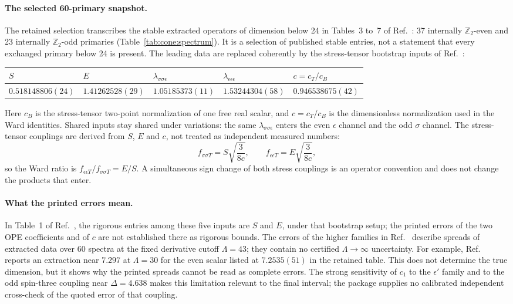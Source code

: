 \documentclass[11pt,a4paper]{article}
\numberwithin{equation}{section}
\begin{document}
\paragraph{The selected 60-primary snapshot.} The retained selection transcribes the stable extracted operators of
dimension below 24 in Tables~3 to~7 of Ref.~\cite{Simmons-Duffin:2016wlq}: 37 internally $\mathbb Z_2$-even and 23
internally $\mathbb Z_2$-odd primaries (Table~\ref{tab:cone:spectrum}). It is a selection of published stable entries,
not a statement that every exchanged primary below 24 is present. The leading data are replaced coherently by the
stress-tensor bootstrap inputs of Ref.~\cite{Chang:2024whx}:
\begin{center}\small
\begin{tabular}{@{}lllll@{}}
\toprule
$S$ & $E$ & $\lambda_{\sigma\sigma\epsilon}$ & $\lambda_{\epsilon\epsilon\epsilon}$ & $c=c_T/c_B$\\
\midrule
$0.518148806(24)$ & $1.41262528(29)$ & $1.05185373(11)$ & $1.53244304(58)$ & $0.946538675(42)$\\
\bottomrule
\end{tabular}
\end{center}
Here $c_B$ is the stress-tensor two-point normalization of one free real scalar, and $c=c_T/c_B$ is the dimensionless
normalization used in the Ward identities. Shared inputs stay shared under variations: the same
$\lambda_{\sigma\sigma\epsilon}$ enters the even $\epsilon$ channel and the odd $\sigma$ channel. The stress-tensor
couplings are derived from $S$, $E$ and $c$, not treated as independent measured numbers:
\begin{equation}
 f_{\sigma\sigma T}=S\sqrt{\frac{3}{8c}},\qquad f_{\epsilon\epsilon T}=E\sqrt{\frac{3}{8c}},
 \label{eq:cone:ward}
\end{equation}
so the Ward ratio is $f_{\epsilon\epsilon T}/f_{\sigma\sigma T}=E/S$. A simultaneous sign change of both stress
couplings is an operator convention and does not change the products that enter.

\paragraph{What the printed errors mean.} In Table~1 of Ref.~\cite{Chang:2024whx}, the rigorous entries among these
five inputs are $S$ and $E$, under that bootstrap setup; the printed errors of the two OPE coefficients and of $c$ are
not established there as rigorous bounds. The errors of the higher families in Ref.~\cite{Simmons-Duffin:2016wlq}
describe spreads of extracted data over 60 spectra at the fixed derivative cutoff $\Lambda=43$; they contain no
certified $\Lambda\to\infty$ uncertainty. For example, Ref.~\cite{Henriksson:2022} reports an extraction near $7.297$
at $\Lambda=30$ for the even scalar listed at $7.2535(51)$ in the retained table. This does not determine the true
dimension, but it shows why the printed spreads cannot be read as complete errors. The strong sensitivity of $c_1$ to
the $\epsilon'$ family and to the odd spin-three coupling near $\Delta=4.638$ makes this limitation relevant to the
final interval; the package supplies no calibrated independent cross-check of the quoted error of that coupling.
\end{document}
